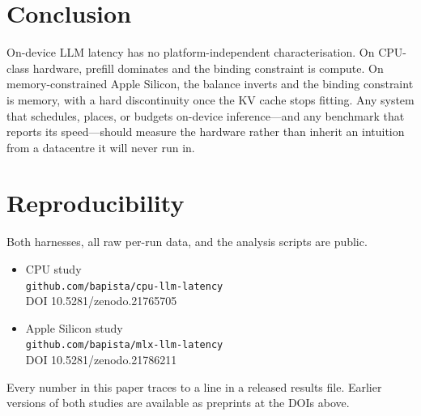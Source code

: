 \documentclass[sigconf,nonacm,10pt]{acmart}
\begin{document}
\section{Conclusion}

On-device LLM latency has no platform-independent characterisation. On CPU-class hardware, prefill dominates and
the binding constraint is compute. On memory-constrained Apple Silicon, the balance inverts and the binding
constraint is memory, with a hard discontinuity once the KV cache stops fitting. Any system that schedules,
places, or budgets on-device inference---and any benchmark that reports its speed---should measure the hardware
rather than inherit an intuition from a datacentre it will never run in.

\section*{Reproducibility}
\label{sec:repro}

Both harnesses, all raw per-run data, and the analysis scripts are public.

\begin{itemize}\itemsep2pt
  \item CPU study\\
        \texttt{\small github.com/bapista/cpu-llm-latency}\\
        DOI 10.5281/zenodo.21765705
  \item Apple Silicon study\\
        \texttt{\small github.com/bapista/mlx-llm-latency}\\
        DOI 10.5281/zenodo.21786211
\end{itemize}

Every number in this paper traces to a line in a released results file. Earlier versions of both studies are
available as preprints at the DOIs above.



\end{document}
